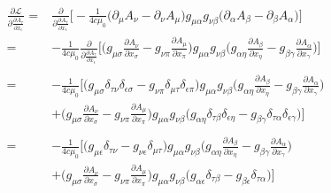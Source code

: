 \documentclass{article}
\begin{document}
\begin{align}
    \frac{\partial \mathcal{L}}{\partial\frac{\partial A_\tau}{\partial x_\epsilon}}
      = & \frac{\partial}{\partial\frac{\partial A_\tau}{\partial x_\epsilon}}
         \bigg[
            -\frac{1}{4 c \mu_0}
            \big(\partial_\mu A_\nu - \partial_\nu A_\mu \big)
            g_{\mu\alpha} g_{\nu\beta}
            \big(\partial_\alpha A_\beta - \partial_\beta A_\alpha\big)
        \bigg] \\
     = & -\frac{1}{4 c \mu_0} \frac{\partial}{\partial\frac{\partial A_\tau}{\partial x_\epsilon}}
        \bigg[
            \bigg(g_{\mu\sigma} \frac{\partial A_\nu}{\partial x_\sigma} - g_{\nu\pi} \frac{\partial A_\mu}{\partial x_\pi} \bigg)
            g_{\mu\alpha} g_{\nu\beta}
            \bigg(g_{\alpha\eta} \frac{\partial A_\beta}{\partial x_\eta} - g_{\beta\gamma} \frac{\partial A_\alpha}{\partial x_\gamma} \bigg)
        \bigg] \nonumber \\ \\
     = & -\frac{1}{4 c \mu_0}
        \bigg[
             \bigg(g_{\mu\sigma} \delta_{\tau\nu}\delta_{\epsilon\sigma} - g_{\nu\pi}\delta_{\mu\tau}\delta_{\epsilon\pi} \bigg)
                  g_{\mu\alpha} g_{\nu\beta}
             \bigg(g_{\alpha\eta} \frac{\partial A_\beta}{\partial x_\eta} - g_{\beta\gamma} \frac{\partial A_\alpha}{\partial x_\gamma} \bigg) \nonumber \\
        & +  \bigg(g_{\mu\sigma} \frac{\partial A_\nu}{\partial x_\sigma} - g_{\nu\pi} \frac{\partial A_\mu}{\partial x_\pi} \bigg)
                g_{\mu\alpha} g_{\nu\beta}
             \bigg( g_{\alpha\eta}\delta_{\tau\beta}\delta_{\epsilon\eta} - g_{\beta\gamma}\delta_{\tau\alpha}\delta_{\epsilon\gamma} \bigg)
        \bigg] \nonumber \\ \\
    = & -\frac{1}{4 c \mu_0}
    \bigg[
            \bigg(g_{\mu\epsilon} \delta_{\tau\nu} - g_{\nu\epsilon}\delta_{\mu\tau} \bigg)
            g_{\mu\alpha} g_{\nu\beta}
            \bigg(g_{\alpha\eta} \frac{\partial A_\beta}{\partial x_\eta} - g_{\beta\gamma} \frac{\partial A_\alpha}{\partial x_\gamma} \bigg) \nonumber \\
        & +  \bigg(g_{\mu\sigma} \frac{\partial A_\nu}{\partial x_\sigma} - g_{\nu\pi} \frac{\partial A_\mu}{\partial x_\pi} \bigg)
        g_{\mu\alpha} g_{\nu\beta}
        \bigg( g_{\alpha\epsilon}\delta_{\tau\beta} - g_{\beta\epsilon}\delta_{\tau\alpha} \bigg)
    \bigg] \nonumber \\ \\

\end{align}
\end{document}
